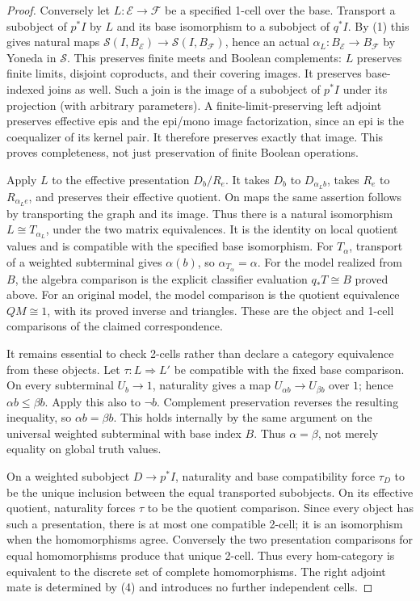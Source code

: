 \begin{proof}
Conversely let \(L:\mathcal E\to\mathcal F\) be a specified
1-cell over the base. Transport a subobject of \(p^*I\) by \(L\)
and its base isomorphism to a subobject of \(q^*I\).
By (1) this gives natural maps
\(\mathcal S(I,B_{\mathcal E})\to
\mathcal S(I,B_{\mathcal F})\), hence an actual
\(\alpha_L:B_{\mathcal E}\to B_{\mathcal F}\) by Yoneda in
\(\mathcal S\). This preserves finite meets and Boolean
complements: \(L\) preserves finite limits, disjoint coproducts,
and their covering images. It preserves base-indexed joins as well.
Such a join is the image of a subobject of \(p^*I\) under its
projection (with arbitrary parameters). A finite-limit-preserving
left adjoint preserves effective epis and the epi/mono image
factorization, since an epi is the coequalizer of its kernel pair.
It therefore preserves exactly that image. This proves completeness,
not just preservation of finite Boolean operations.

Apply \(L\) to the effective presentation \(D_b/R_e\).
It takes \(D_b\) to \(D_{\alpha_L b}\), takes \(R_e\)
to \(R_{\alpha_L e}\), and preserves their effective quotient.
On maps the same assertion follows by transporting the graph and its
image. Thus there is a natural isomorphism
\(L\cong T_{\alpha_L}\), under the two matrix equivalences.
It is the identity on local quotient values and is compatible with
the specified base isomorphism. For \(T_\alpha\), transport of
a weighted subterminal gives \(\alpha(b)\), so
\(\alpha_{T_\alpha}=\alpha\). For the model realized from \(B\),
the algebra comparison is the explicit classifier evaluation
\(q_*T\cong B\) proved above. For an original model, the
model comparison is the quotient equivalence \(QM\cong1\),
with its proved inverse and triangles. These are the object and
1-cell comparisons of the claimed correspondence.

It remains essential to check 2-cells rather than declare a category
equivalence from these objects. Let \(\tau:L\Rightarrow L'\)
be compatible with the fixed base comparison. On every subterminal
\(U_b\to1\), naturality gives a map
\(U_{\alpha b}\to U_{\beta b}\) over \(1\); hence
\(\alpha b\le\beta b\). Apply this also to \(\neg b\).
Complement preservation reverses the resulting inequality, so
\(\alpha b=\beta b\). This holds internally by the same argument
on the universal weighted subterminal with base index \(B\).
Thus \(\alpha=\beta\), not merely equality on global truth values.

On a weighted subobject \(D\to p^*I\), naturality and base
compatibility force \(\tau_D\) to be the unique inclusion between
the equal transported subobjects. On its effective quotient, naturality
forces \(\tau\) to be the quotient comparison. Since every object
has such a presentation, there is at most one compatible 2-cell; it is
an isomorphism when the homomorphisms agree. Conversely the two
presentation comparisons for equal homomorphisms produce that unique
2-cell. Thus every hom-category is equivalent to the discrete set of
complete homomorphisms. The right adjoint mate is determined by (4)
and introduces no further independent cells.


\end{proof}
